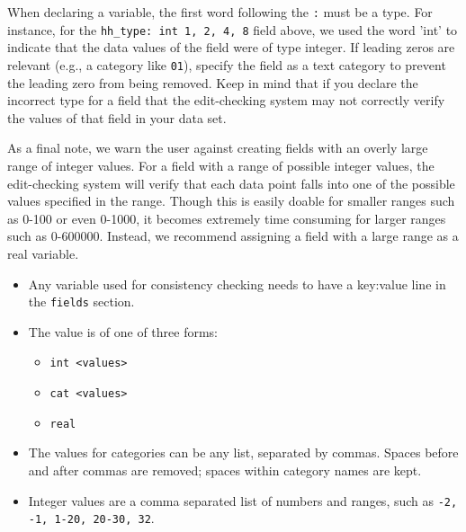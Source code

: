 \documentclass{article}
\begin{document}
When declaring a variable, the first word following the {\tt :} must be a type. For instance, 
for the {\tt hh\_type: int 1, 2, 4, 8} field above, we used the word 'int' to indicate that 
the data values of the field were of type integer. If leading zeros are relevant (e.g.,
a category like {\tt 01}), specify the field as a text category to prevent the leading
zero from being removed.  Keep in mind 
that if you declare the incorrect type for a field that the edit-checking system may not correctly 
verify the values of that field in your data set.

As a final note, we warn the user against creating fields with an overly large range of
integer values. For a field with a range of possible integer values, the edit-checking
system will verify that each data point falls into one of the possible values specified
in the range. Though this is easily doable for smaller ranges such as 0-100 or even
0-1000, it becomes extremely time consuming for larger ranges such as 0-600000. Instead,
we recommend assigning a field with a large range as a real variable.


\begin{itemize}
\item Any variable used for consistency checking needs to have a key:value line in the
{\tt fields} section.
\item The value is of one of three forms:
    \begin{itemize}
    \item {\tt int <values>}
    \item {\tt cat <values>}
    \item {\tt real}
    \end{itemize}
\item The values for categories can be any list, separated by commas. Spaces before and
after commas are removed; spaces within category names are kept. 
\item Integer values are a comma separated list of numbers and ranges, such as {\tt -2, -1, 1-20, 20-30, 32}.
\end{itemize}

%
\end{document}
